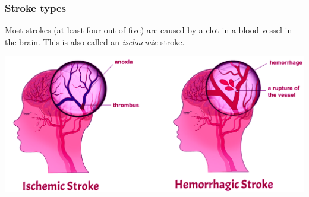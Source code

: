 \begin{frame}
\frametitle{Stroke types}

Most strokes (at least four out of five) are caused by a clot in a blood vessel in the brain. This is also called an \emph{ischaemic} stroke.

\vspace{3mm}



\begin{center}
\includegraphics[width=1.0\textwidth]{./images/stroke_types}
\end{center}


\end{frame}
